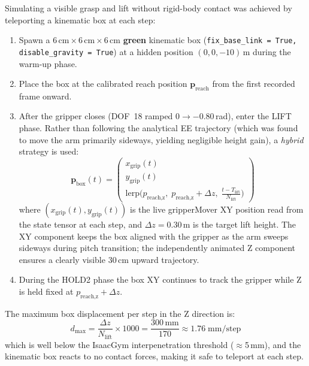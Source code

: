 Simulating a visible grasp and lift without rigid-body contact was
achieved by teleporting a kinematic box at each step:
\begin{enumerate}
  \item Spawn a $6\,\text{cm}\times6\,\text{cm}\times6\,\text{cm}$
        \textbf{green} kinematic box
        (\texttt{fix\_base\_link = True, disable\_gravity = True}) at a
        hidden position $(0, 0, -10)$\,m during the warm-up phase.
  \item Place the box at the calibrated reach position
        $\mathbf{p}_\text{reach}$ from the first recorded frame onward.
  \item After the gripper closes (DOF~18 ramped $0 \to -0.80$\,rad),
        enter the LIFT phase.  Rather than following the analytical EE
        trajectory (which was found to move the arm primarily sideways,
        yielding negligible height gain), a \emph{hybrid} strategy is used:
        \begin{equation}
          \mathbf{p}_\text{box}(t) =
          \begin{pmatrix}
            x_\text{grip}(t) \\
            y_\text{grip}(t) \\
            \text{lerp}\!\bigl(
              p_\text{reach,z},\;
              p_\text{reach,z} + \Delta z,\;
              \tfrac{t - T_\text{lift}}{N_\text{lift}}
            \bigr)
          \end{pmatrix}
          \label{eq:hybrid_lift}
        \end{equation}
        where $(x_\text{grip}(t), y_\text{grip}(t))$ is the live gripperMover
        XY position read from the state tensor at each step, and
        $\Delta z = 0.30$\,m is the target lift height.
        The XY component keeps the box aligned with the gripper as the arm
        sweeps sideways during pitch transition; the independently animated
        Z component ensures a clearly visible 30\,cm upward trajectory.
  \item During the HOLD2 phase the box XY continues to track the gripper
        while Z is held fixed at $p_\text{reach,z} + \Delta z$.
\end{enumerate}

The maximum box displacement per step in the Z direction is:
\[
  d_\text{max} = \frac{\Delta z}{N_\text{lift}} \times 1000
  = \frac{300\,\text{mm}}{170} \approx 1.76\;\text{mm/step}
\]
which is well below the IsaacGym interpenetration threshold
($\approx$5\,mm), and the kinematic box reacts to no contact forces,
making it safe to teleport at each step.

